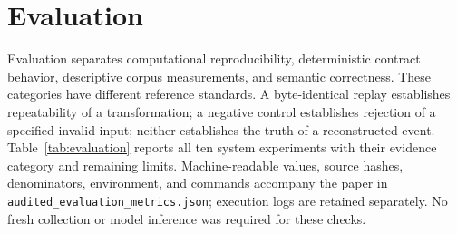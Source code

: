 \section{Evaluation}
\label{sec:evaluation}

Evaluation separates computational reproducibility, deterministic contract behavior, descriptive corpus measurements, and semantic correctness. These categories have different reference standards. A byte-identical replay establishes repeatability of a transformation; a negative control establishes rejection of a specified invalid input; neither establishes the truth of a reconstructed event. Table~\ref{tab:evaluation} reports all ten system experiments with their evidence category and remaining limits. Machine-readable values, source hashes, denominators, environment, and commands accompany the paper in \texttt{audited\_evaluation\_metrics.json}; execution logs are retained separately. No fresh collection or model inference was required for these checks.

